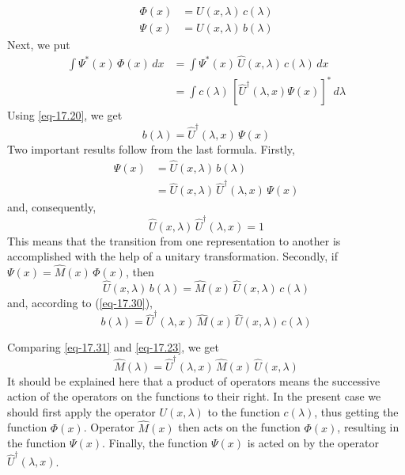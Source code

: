 \documentclass[a4paper,sfsidenotes,colorlinks=true]{tufte-book}
\numberwithin{equation}{section}
\numberwithin{figure}{section}
\begin{document}
\begin{equation}%
\begin{split}
\Phi (x) & = U(x, \lambda) \, c (\lambda) \\
\Psi (x) & =  U(x, \lambda) \, b (\lambda) 
\end{split}
\label{eq-17.29}
\end{equation}
Next, we put 
\begin{equation*}%
\begin{split}
\int \Psi^{*} (x) \, \Phi (x) \, dx & = \int \Psi^{*}(x) \, \hat{U}
(x, \lambda) \, c(\lambda) \, dx \\
& =  \int c(\lambda) \, \left[ \hat{U}^{\dagger} (\lambda, x) \Psi (x)
\right]^{*} \, d \lambda
\end{split}
\end{equation*}
Using \ref{eq-17.20}, we get
\begin{equation*}%
b(\lambda) =  \hat{U}^{\dagger} (\lambda, x) \, \Psi(x)
\end{equation*}
Two important results follow from the last formula. Firstly,
\begin{equation*}%
\begin{split}
\Psi(x) & =  \hat{U} (x, \lambda) \, b(\lambda) \\
& = \hat{U} (x, \lambda) \, \hat{U}^{\dagger} (\lambda, x) \, \Psi(x)
\end{split}
\end{equation*}
and, consequently, 
\begin{equation}%
\hat{U} (x, \lambda) \, \hat{U}^{\dagger} (\lambda, x) = 1
\label{eq-17.30}
\end{equation}
This means that the
transition from one representation to another is accomplished with the
help of a unitary transformation. Secondly, if 
$\Psi(x) =  \hat{M} (x) \, \Phi(x)$, then  
\begin{equation*}
\hat{U} (x, \lambda) \,
b(\lambda) = \hat{M}(x) \, \hat{U} (x, \lambda) \, c(\lambda) 
\end{equation*}
and, according to (\ref{eq-17.30}), 
\begin{equation}%
b(\lambda) =  \hat{U}^{\dagger} (\lambda, x) \, \hat{M}(x) \,
\hat{U} (x, \lambda) \, c(\lambda)
\label{eq-17.31} 
\end{equation}

Comparing \ref{eq-17.31} and \ref{eq-17.23}, we get
\begin{equation}%
\hat{M} (\lambda) = \hat{U}^{\dagger} (\lambda, x) \, \hat{M}(x) \,
\hat{U} (x, \lambda) 
\label{eq-17.32} 
\end{equation}
It should be explained here that a product of operators means the
successive action of the operators on the functions to their right. In
the present case we should first apply the operator $U (x, \lambda)$
to the function $c (\lambda)$, thus getting the function
$\Phi(x)$. Operator $\hat{M} (x)$ then acts on the function $\Phi(x)$,
resulting in the function $\Psi(x)$. Finally, the function $\Psi (x)$ is
acted on by the operator  $\hat{U}^{\dagger} (\lambda, x)$.
\end{document}

